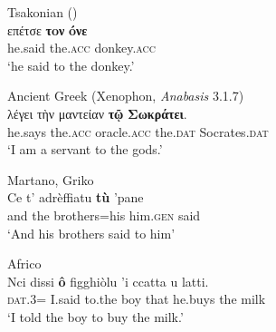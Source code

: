 \documentclass[output=paper,modfonts,nonflat,colorlinks,citecolor=brown]{langsci/langscibook}
\begin{document}
 \newpage 
\ea\label{ex:ledgeway:10}

  \ea  Tsakonian (\citealt{ManolessouBeis2004})\\
\gll      επ\'{ε}τσε  \textbf{τoν} \textbf{óνε} \\
      he.said  the.\textsc{acc}  donkey.\textsc{acc} \\
      \glt `he said to the donkey.'
      
\ex Ancient Greek (Xenophon, \textit{Anabasis} 3.1.7)  \\
\gll  λ\'{ε}γει τὴν μαντείαν \textbf{τῷ} \textbf{Σωκράτει}.\\
      he.says  the.\textsc{acc}  oracle.\textsc{acc}  the.\textsc{dat}  Socrates.\textsc{dat}\\
      \glt `I am a servant to the gods.'

\ex Martano, Griko\\
      \gll Ce  t’  adrèffiatu  \textbf{tù} ’pane\\
      and  the  brothers=his  him.\textsc{gen}  said\\
      \glt `And his brothers said to him'

\ex Africo\\
      \gll Nci  dissi  \textbf{ô} figghiòlu  ’i  ccatta  u  latti.\\
      \textsc{dat}.3=  I.said  to.the  boy  that  he.buys  the  milk\\
      \glt `I told the boy to buy the milk.'
      \z
      \z
\end{document}
